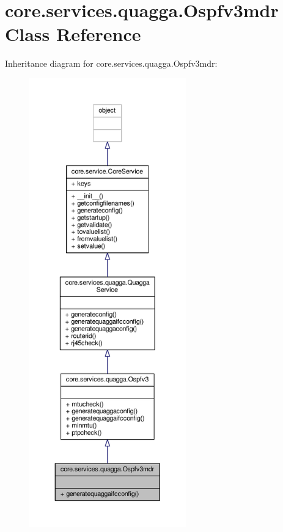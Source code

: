 \hypertarget{classcore_1_1services_1_1quagga_1_1_ospfv3mdr}{\section{core.\+services.\+quagga.\+Ospfv3mdr Class Reference}
\label{classcore_1_1services_1_1quagga_1_1_ospfv3mdr}
}


Inheritance diagram for core.\+services.\+quagga.\+Ospfv3mdr\+:
\nopagebreak
\begin{figure}[H]
\begin{center}
\leavevmode
\includegraphics[height=550pt]{classcore_1_1services_1_1quagga_1_1_ospfv3mdr__inherit__graph}
\end{center}
\end{figure}


